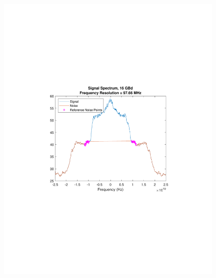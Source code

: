 \begin{refsection}
\begin{figure}[H]
	\centering

	\begin{minipage}{0.43\textwidth}
		\centering
		\includegraphics[clip, trim=4cm 8cm 4cm 8cm,
		width=1\textwidth]{./sdf/m_qam_system/figures/snr/minMaxSpec/16GBdMinSpecHSNR.pdf}
		\subcaption{\label{fig:snrMinFreq_16_10_500}}
		

\end{minipage}
\end{figure}
\end{refsection}
